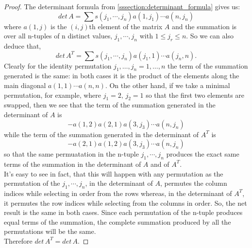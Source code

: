 \documentclass[MathsNotesBase.tex]{subfiles}
\begin{document}
{		\bigskip
		\begin{proof}
			The determinant formula from \ref{sssection:determinant_formula} gives us:
			\[ det\, A = \sum s(j_1,\cdots,j_n)a(1,j_1) \cdots a(n,j_n) \]
			where $a(1,j)$ is the $(i,j)$th element of the matrix $A$ and the summation is over all n-tuples of n distinct values, $j_1, \cdots, j_n$ with ${1 \leq j_r \leq n}$. So we can also deduce that,
			\[ det\, A^T = \sum s(j_1,\cdots,j_n)a(j_1,1) \cdots a(j_n,n). \]
			Clearly for the identity permutation ${ j_1,\dots,j_n = 1,\dots,n }$ the term of the summation generated is the same: in both cases it is the product of the elements along the main diagonal ${ a(1,1)\cdots a(n,n) }$. On the other hand, if we take a minimal permutation, for example, where ${ j_1 = 2,\, j_2 = 1 }$ so that the first two elements are swapped, then we see that the term of the summation generated in the determinant of $A$ is
			\[ -a(1,2)a(2,1)a(3,j_3) \cdots a(n,j_n) \]
			while the term of the summation generated in the determinant of $A^T$ is
			\[ -a(2,1)a(1,2)a(3,j_3) \cdots a(n,j_n) \]
			so that the same permuatation in the n-tuple $j_1, \cdots, j_n$ produces the exact same terms of the summation in the determinant of $A$ and of $A^T$.\\
			It's easy to see in fact, that this will happen with any permutation as the permutation of the $j_1, \cdots, j_n$, in the determinant of $A$, permutes the column indices while selecting in order from the rows whereas, in the determinant of $A^T$, it permutes the row indices while selecting from the columns in order. So, the net result is the same in both cases. Since each permutation of the n-tuple produces equal terms of the summation, the complete summation produced by all the permutations will be the same.\\
			Therefore ${ det\,A^T = det\,A. }$
		\end{proof}
	}
\end{document}
